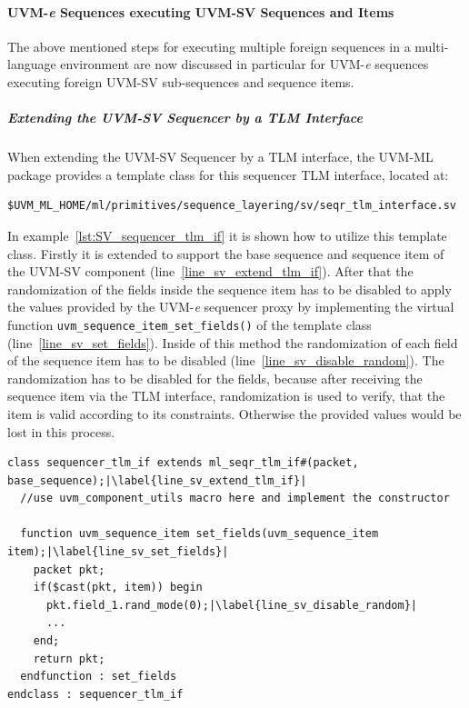 \paragraph{UVM-\textit{e} Sequences executing UVM-SV Sequences and Items}
The above mentioned steps for executing multiple foreign sequences in a multi-language environment are now discussed in particular for UVM-\textit{e} sequences executing foreign UVM-SV sub-sequences and sequence items.
\subparagraph{Extending the UVM-SV Sequencer by a TLM Interface}
When extending the UVM-SV Sequencer by a TLM interface, the UVM-ML package provides a template class for this sequencer TLM interface, located at:
\smallskip
{}
\begin{lstlisting}
$UVM_ML_HOME/ml/primitives/sequence_layering/sv/seqr_tlm_interface.sv
\end{lstlisting} 
\smallskip
In example~\ref{lst:SV_sequencer_tlm_if} it is shown how to utilize this template class. Firstly it is extended to support the base sequence and sequence item of the UVM-SV component (line~\ref{line_sv_extend_tlm_if}). After that the randomization of the fields inside the sequence item has to be disabled to apply the values provided by the UVM-\textit{e} sequencer proxy by implementing the virtual function \lstinline$uvm_sequence_item_set_fields()$ of the template class (line~\ref{line_sv_set_fields}). Inside of this method the randomization of each field of the sequence item has to be disabled (line~\ref{line_sv_disable_random}). The randomization has to be disabled for the fields, because after receiving the sequence item via the TLM interface, randomization is used to verify, that the item is valid according to its constraints. Otherwise the provided values would be lost in this process.
\lstset{language=SystemVerilog, numbers = left, escapechar=|, breaklines=true}
\begin{lstlisting}[frame=htrbl, caption={SystemVerilog: creating the TLM interface for the sequencer},
label={lst:SV_sequencer_tlm_if}]
class sequencer_tlm_if extends ml_seqr_tlm_if#(packet, base_sequence);|\label{line_sv_extend_tlm_if}|
  //use uvm_component_utils macro here and implement the constructor

  function uvm_sequence_item set_fields(uvm_sequence_item item);|\label{line_sv_set_fields}|
    packet pkt;   
    if($cast(pkt, item)) begin
      pkt.field_1.rand_mode(0);|\label{line_sv_disable_random}|
      ...
    end;
    return pkt;      
  endfunction : set_fields
endclass : sequencer_tlm_if
\end{lstlisting}

